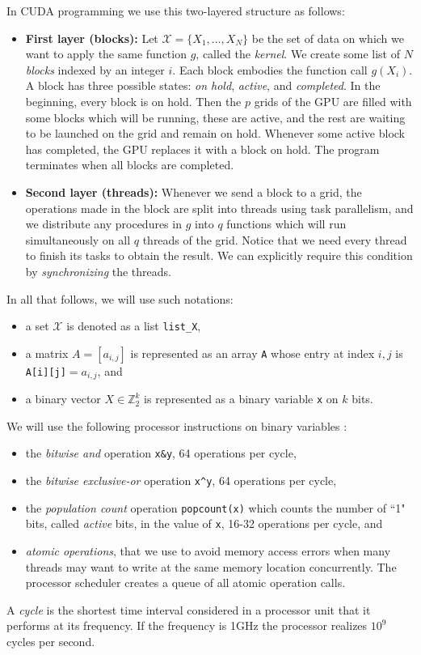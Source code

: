 \documentclass[11pt]{amsart}
\theoremstyle{plain}
\numberwithin{equation}{section}
\theoremstyle{definition}
\newcommand{\cX}{\mathcal{X}}
\newcommand{\Z}{\mathbb{Z}}
\begin{document}
In CUDA programming we use this two-layered structure as follows:
\begin{itemize}
	\item \textbf{First layer (blocks):} Let $\cX=\{X_1,\ldots,X_N\}$ be the set of data on which we want to apply the same function $g$, called the \emph{kernel}.
	We create some list of $N$ \emph{blocks} indexed by an integer $i$.
	Each block embodies the function call $g(X_i)$.
	A block has three possible states: \emph{on hold}, \emph{active}, and \emph{completed}.
	In the beginning, every block is on hold.
	Then the $p$ grids of the GPU are filled with some blocks which will be running, these are active, and the rest are waiting to be launched on the grid and remain on hold.
	Whenever some active block has completed, the GPU replaces it with a block on hold.
	The program terminates when all blocks are completed.
	\item \textbf{Second layer (threads):} Whenever we send a block to a grid, the operations made in the block are split into threads using task parallelism, and we distribute any procedures in $g$ into $q$ functions which will run simultaneously on all $q$ threads of the grid.
	Notice that we need every thread to finish its tasks to obtain the result.
	We can explicitly require this condition by \emph{synchronizing} the threads.
\end{itemize}
\medskip

In all that follows, we will use such notations:
\begin{itemize}
	\item a set $\cX$ is denoted as a list \texttt{list\_X},
	\item a matrix $A = [a_{i,j}]$ is represented as an array \texttt{A} whose entry at index $i,j$ is \texttt{A[i][j]}$=a_{i,j}$, and
	\item a binary vector $X\in\Z_2^k$ is represented as a binary variable \texttt{x} on $k$ bits.
\end{itemize}

We will use the following processor instructions on binary variables \cite{cuda}:
\begin{itemize}
	\item the \emph{bitwise and} operation \texttt{x\&y}, 64 operations per cycle,
	\item the \emph{bitwise exclusive-or} operation \texttt{x\^{}y}, 64 operations per cycle,
	\item the \emph{population count} operation \texttt{popcount(x)} which counts the number of ``1" bits, called \emph{active} bits, in the value of \texttt{x}, 16-32 operations per cycle, and
	\item \emph{atomic operations}, that we use to avoid memory access errors when many threads may want to write at the same memory location concurrently. The processor scheduler creates a queue of all atomic operation calls.
\end{itemize}
A \emph{cycle} is the shortest time interval considered in a processor unit that it performs at its frequency.
If the frequency is 1GHz the processor realizes $10^9$ cycles per second.
\end{document}
